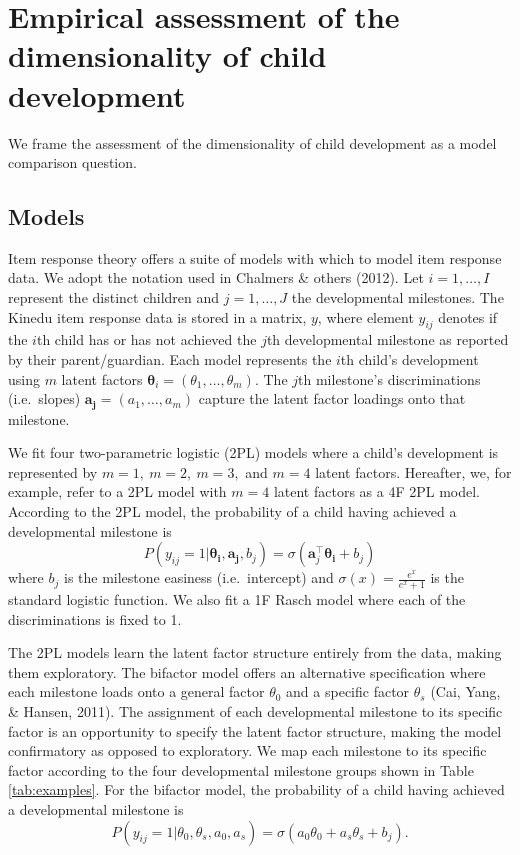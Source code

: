 \documentclass[10pt, letterpaper]{article}
\begin{document}
\hypertarget{empirical-assessment-of-the-dimensionality-of-child-development}{%
\section{Empirical assessment of the dimensionality of child
development}\label{empirical-assessment-of-the-dimensionality-of-child-development}}

We frame the assessment of the dimensionality of child development as a
model comparison question.

\hypertarget{models}{%
\subsection{Models}\label{models}}

Item response theory offers a suite of models with which to model item
response data. We adopt the notation used in Chalmers \& others (2012).
Let \(i = 1, \ldots, I\) represent the distinct children and
\(j = 1, \ldots, J\) the developmental milestones. The Kinedu item
response data is stored in a matrix, \(y\), where element \(y_{ij}\)
denotes if the \(i\)th child has or has not achieved the \(j\)th
developmental milestone as reported by their parent/guardian. Each model
represents the \(i\)th child's development using \(m\) latent factors
\(\boldsymbol{\theta}_{i}=(\theta_1, \dots, \theta_m)\). The \(j\)th
milestone's discriminations (i.e.~slopes)
\(\boldsymbol{a_j}=(a_1, \dots, a_m)\) capture the latent factor
loadings onto that milestone.

We fit four two-parametric logistic (2PL) models where a child's
development is represented by \(m = 1, \ m = 2, \ m = 3,\) and \(m = 4\)
latent factors. Hereafter, we, for example, refer to a 2PL model with
\(m = 4\) latent factors as a 4F 2PL model. According to the 2PL model,
the probability of a child having achieved a developmental milestone is
\[
P(y_{ij} = 1 | \boldsymbol{\theta_i}, \boldsymbol{a_j}, b_j) = \sigma(\boldsymbol{a}_{j}^{\top}\boldsymbol{\theta_i} + b_j)
\] where \(b_j\) is the milestone easiness (i.e.~intercept) and
\(\sigma(x) = \frac{e^x}{e^x + 1}\) is the standard logistic function.
We also fit a 1F Rasch model where each of the discriminations is fixed
to 1.

The 2PL models learn the latent factor structure entirely from the data,
making them exploratory. The bifactor model offers an alternative
specification where each milestone loads onto a general factor
\(\theta_0\) and a specific factor \(\theta_s\) (Cai, Yang, \& Hansen,
2011). The assignment of each developmental milestone to its specific
factor is an opportunity to specify the latent factor structure, making
the model confirmatory as opposed to exploratory. We map each milestone
to its specific factor according to the four developmental milestone
groups shown in Table \ref{tab:examples}. For the bifactor model, the
probability of a child having achieved a developmental milestone is \[
P(y_{ij} = 1 | \theta_0, \theta_s, a_0, a_s) = \sigma(a_0\theta_0 + a_s\theta_s + b_j).
\]
\end{document}

